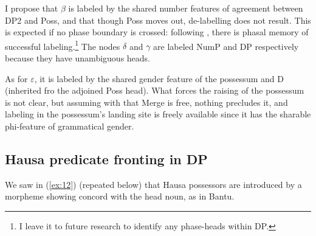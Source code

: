 \documentclass[output=paper
,modfonts
,nonflat]{langsci/langscibook}
\begin{document}
\begin{figure}[!h]
	\begin{exe}
	\end{exe}
\end{figure}
\noindent I propose that $\beta$ is labeled by the shared number features of agreement between DP2 and Poss, and that though Poss moves out, de-labelling does not result. This is expected if no phase boundary is crossed: following \citet[11]{Chomsky2015}, there is phasal memory of successful labeling.\footnote{I leave it to future research to identify any phase-heads within DP.}  The nodes $\delta$ and $\gamma$ are labeled NumP and DP respectively because they have unambiguous heads. 

As for $\varepsilon$, it is labeled by the shared gender feature of the possessum and D (inherited fro the adjoined Poss head). What forces the raising of the possessum is not clear, but assuming with \citealt{Chomsky2015} that Merge is free, nothing precludes it, and labeling in the possessum’s landing site is freely available since it has the sharable phi-feature of grammatical gender. 

\subsection{Hausa predicate fronting in DP} \label{sec:6.4}
We saw in (\ref{ex:12}) (repeated below) that Hausa possessors are introduced by a morpheme showing concord with the head noun, as in Bantu. 
\end{document}

